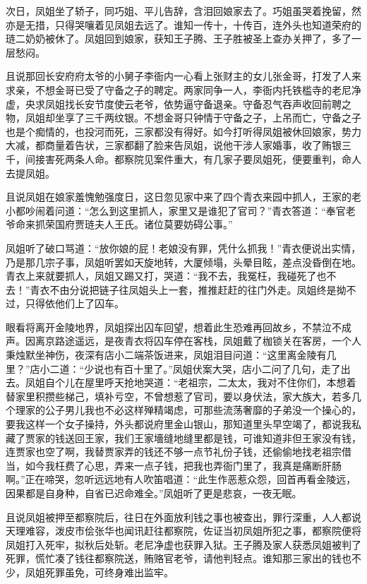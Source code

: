 \documentclass[12pt,oneside]{book}
\begin{document}
次日，凤姐坐了轿子，同巧姐、平儿告辞，含泪回娘家去了。巧姐虽哭着挽留，然亦是无措，只得哭嚷着见凤姐去远了。谁知一传十，十传百，连外头也知道荣府的琏二奶奶被休了。凤姐回到娘家，获知王子腾、王子胜被圣上查办关押了，多了一层愁闷。

且说那回长安府府太爷的小舅子李衙内一心看上张财主的女儿张金哥，打发了人来求亲，不想金哥已受了守备之子的聘定。两家同争一人，李衙内托铁槛寺的老尼净虚，央求凤姐找长安节度使云老爷，依势逼守备退亲。守备忍气吞声收回前聘之物，凤姐却坐享了三千两纹银。不想金哥只钟情于守备之子，上吊而亡，守备之子也是个痴情的，也投河而死，三家都没有得好。如今打听得凤姐被休回娘家，势力大减，都商量着告状，三家都翻了脸来告凤姐，说他干涉人家婚事，收了贿银三千，间接害死两条人命。都察院见案件重大，有几家子要凤姐死，便要重判，命人去提凤姐。

且说凤姐在娘家羞愧勉强度日，这日忽见家中来了四个青衣来园中抓人，王家的老小都吵闹着问道：“怎么到这里抓人，家里又是谁犯了官司？”青衣答道：“奉官老爷命来抓荣国府贾琏夫人王氏。诸位莫要妨碍公事。”

凤姐听了破口骂道：“放你娘的屁！老娘没有罪，凭什么抓我！”青衣便说出实情，乃是那几宗子事，凤姐听罢如天旋地转，大厦倾塌，头晕目眩，差点没昏倒在地。青衣上来就要抓人，凤姐又踢又打，哭道：“我不去，我冤枉，我碰死了也不去！”青衣不由分说把链子往凤姐头上一套，推推赶赶的往门外走。凤姐终是拗不过，只得依他们上了囚车。

眼看将离开金陵地界，凤姐探出囚车回望，想着此生恐难再回故乡，不禁泣不成声。因离京路途遥远，是夜青衣将囚车停在客栈，凤姐戴了枷锁关在客房，一个人秉烛默坐神伤，夜深有店小二端茶饭进来，凤姐泪目问道：“这里离金陵有几里？”店小二道：“少说也有百十里了。”凤姐伏案大哭，店小二问了几句，走了出去。凤姐自个儿在屋里呼天抢地哭道：“老祖宗，二太太，我对不住你们，本想着替家里积攒些梯己，填补亏空，不曾想惹了官司，要以身伏法，家大族大，若多几个理家的公子男儿我也不必这样殚精竭虑，可那些流荡奢靡的子弟没一个操心的，要我这样一个女子操持，外头都说府里金山银山，那知道里头早空竭了，都说我私藏了贾家的钱送回王家，我们王家墻缝地缝里都是钱，可谁知道非但王家没有钱，连贾家也空了啊，我替贾家弄的钱还不够一点节礼份子钱，还偷偷地找老祖宗借当，如今我枉费了心思，弄来一点子钱，把我也弄衙门里了，我真是痛断肝肠啊。”正在啼哭，忽听远远地有人吹笛唱道：“此生作恶惹众怨，回首再看金陵远，因果都是自身种，自省已迟命难全。”凤姐听了更是悲哀，一夜无眠。

且说凤姐被押至都察院后，往日在外面放利钱之事也被查出，罪行深重，人人都说天理难容，泼皮市侩张华也闻讯赶往都察院，佐证当初凤姐所犯之事，都察院便将凤姐打入死牢，拟秋后处斩。老尼净虚也获罪入狱。王子腾及家人获悉凤姐被判了死罪，慌忙凑了钱往都察院送，贿赂官老爷，请他判轻点。谁知那三家出的钱也不少，凤姐死罪虽免，可终身难出监牢。
\end{document}
